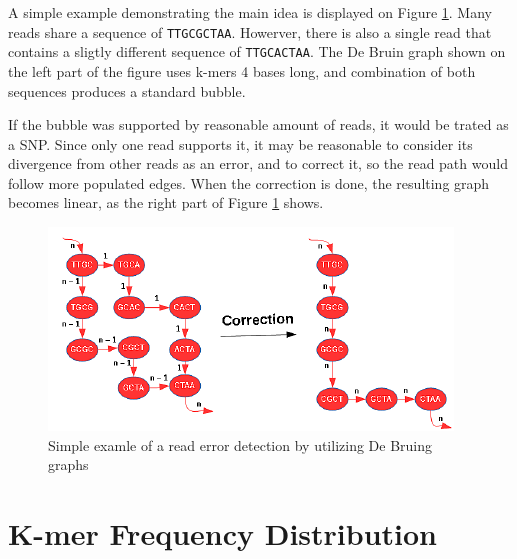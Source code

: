 A simple example demonstrating the main idea is displayed on Figure \ref{fig:error-correction-db}. Many reads share a sequence of \texttt{TTGCGCTAA}. Howerver, there is also a single read that contains a sligtly different sequence of \texttt{TTGCACTAA}. The De Bruin graph shown on the left part of the figure uses k-mers 4 bases long, and combination of both sequences produces a standard bubble.

If the bubble was supported by reasonable amount of reads, it would be trated as a SNP. Since only one read supports it, it may be reasonable to consider its divergence from other reads as an error, and to correct it, so the read path would follow more populated edges. When the correction is done, the resulting graph becomes linear, as the right part of Figure \ref{fig:error-correction-db} shows.

\begin{figure}[h]
	\centering
	\includegraphics{img/error-correction-db.pdf}
	\caption{Simple examle of a read error detection by utilizing De Bruing graphs}
	\label{fig:error-correction-db}
\end{figure}

\section{K-mer Frequency Distribution}
\label{sec:ec-kmer-frequency-distribution}


